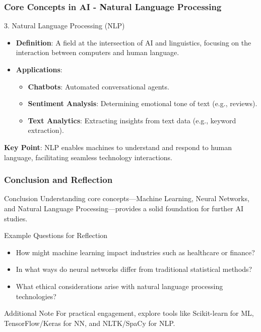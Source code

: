 \documentclass[aspectratio=169]{beamer}
\begin{document}
\begin{frame}[fragile]
    \frametitle{Core Concepts in AI - Natural Language Processing}
    \begin{block}{3. Natural Language Processing (NLP)}
        \begin{itemize}
            \item \textbf{Definition}: A field at the intersection of AI and linguistics, focusing on the interaction between computers and human language.
            \item \textbf{Applications}:
                \begin{itemize}
                    \item \textbf{Chatbots}: Automated conversational agents.
                    \item \textbf{Sentiment Analysis}: Determining emotional tone of text (e.g., reviews).
                    \item \textbf{Text Analytics}: Extracting insights from text data (e.g., keyword extraction).
                \end{itemize}
        \end{itemize}
        \textbf{Key Point}: NLP enables machines to understand and respond to human language, facilitating seamless technology interactions.
    \end{block}
\end{frame}

\begin{frame}[fragile]
    \frametitle{Conclusion and Reflection}
    \begin{block}{Conclusion}
        Understanding core concepts—Machine Learning, Neural Networks, and Natural Language Processing—provides a solid foundation for further AI studies.
    \end{block}

    \begin{block}{Example Questions for Reflection}
        \begin{itemize}
            \item How might machine learning impact industries such as healthcare or finance?
            \item In what ways do neural networks differ from traditional statistical methods?
            \item What ethical considerations arise with natural language processing technologies?
        \end{itemize}
    \end{block}
    
    \begin{block}{Additional Note}
        For practical engagement, explore tools like Scikit-learn for ML, TensorFlow/Keras for NN, and NLTK/SpaCy for NLP.
    \end{block}
\end{frame}
\end{document}
